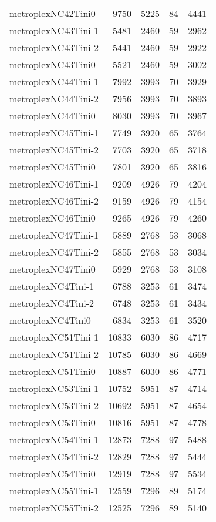 \begin{longtable}{lrrrr}
metroplexNC42Tini0 & 9750 & 5225 & 84 & 4441 \\
metroplexNC43Tini-1 & 5481 & 2460 & 59 & 2962 \\
metroplexNC43Tini-2 & 5441 & 2460 & 59 & 2922 \\
metroplexNC43Tini0 & 5521 & 2460 & 59 & 3002 \\
metroplexNC44Tini-1 & 7992 & 3993 & 70 & 3929 \\
metroplexNC44Tini-2 & 7956 & 3993 & 70 & 3893 \\
metroplexNC44Tini0 & 8030 & 3993 & 70 & 3967 \\
metroplexNC45Tini-1 & 7749 & 3920 & 65 & 3764 \\
metroplexNC45Tini-2 & 7703 & 3920 & 65 & 3718 \\
metroplexNC45Tini0 & 7801 & 3920 & 65 & 3816 \\
metroplexNC46Tini-1 & 9209 & 4926 & 79 & 4204 \\
metroplexNC46Tini-2 & 9159 & 4926 & 79 & 4154 \\
metroplexNC46Tini0 & 9265 & 4926 & 79 & 4260 \\
metroplexNC47Tini-1 & 5889 & 2768 & 53 & 3068 \\
metroplexNC47Tini-2 & 5855 & 2768 & 53 & 3034 \\
metroplexNC47Tini0 & 5929 & 2768 & 53 & 3108 \\
metroplexNC4Tini-1 & 6788 & 3253 & 61 & 3474 \\
metroplexNC4Tini-2 & 6748 & 3253 & 61 & 3434 \\
metroplexNC4Tini0 & 6834 & 3253 & 61 & 3520 \\
metroplexNC51Tini-1 & 10833 & 6030 & 86 & 4717 \\
metroplexNC51Tini-2 & 10785 & 6030 & 86 & 4669 \\
metroplexNC51Tini0 & 10887 & 6030 & 86 & 4771 \\
metroplexNC53Tini-1 & 10752 & 5951 & 87 & 4714 \\
metroplexNC53Tini-2 & 10692 & 5951 & 87 & 4654 \\
metroplexNC53Tini0 & 10816 & 5951 & 87 & 4778 \\
metroplexNC54Tini-1 & 12873 & 7288 & 97 & 5488 \\
metroplexNC54Tini-2 & 12829 & 7288 & 97 & 5444 \\
metroplexNC54Tini0 & 12919 & 7288 & 97 & 5534 \\
metroplexNC55Tini-1 & 12559 & 7296 & 89 & 5174 \\
metroplexNC55Tini-2 & 12525 & 7296 & 89 & 5140 \\

\end{longtable}
